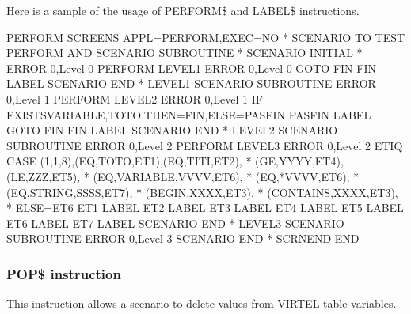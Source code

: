\documentclass[letterpaper,10pt,english]{sphinxmanual}
\begin{document}

Here is a sample of the usage of PERFORM\$ and LABEL\$ instructions.

\begin{sphinxVerbatim}[commandchars=\\\{\}]
PERFORM SCREENS APPL=PERFORM,EXEC=NO
* SCENARIO TO TEST PERFORM\PYGZdl{} AND SCENARIO SUBROUTINE
*
        SCENARIO INITIAL
*
        ERROR\PYGZdl{} 0,\PYGZsq{}Level 0\PYGZsq{}
        PERFORM\PYGZdl{} LEVEL1
        ERROR\PYGZdl{} 0,\PYGZsq{}Level 0\PYGZsq{}
        GOTO\PYGZdl{} FIN
        FIN LABEL\PYGZdl{}
        SCENARIO END
*
LEVEL1  SCENARIO SUBROUTINE
        ERROR\PYGZdl{} 0,\PYGZsq{}Level 1\PYGZsq{}
        PERFORM\PYGZdl{} LEVEL2
        ERROR\PYGZdl{} 0,\PYGZsq{}Level 1\PYGZsq{}
        IF\PYGZdl{} EXISTS\PYGZhy{}VARIABLE,\PYGZsq{}TOTO\PYGZsq{},THEN=FIN,ELSE=PASFIN
        PASFIN LABEL\PYGZdl{}
        GOTO\PYGZdl{} FIN
FIN     LABEL\PYGZdl{}
SCENARIO END
*
LEVEL2  SCENARIO SUBROUTINE
        ERROR\PYGZdl{} 0,\PYGZsq{}Level 2\PYGZsq{}
        PERFORM\PYGZdl{} LEVEL3
        ERROR\PYGZdl{} 0,\PYGZsq{}Level 2\PYGZsq{}
ETIQ    CASE\PYGZdl{} (1,1,8),(EQ,\PYGZsq{}TOTO\PYGZsq{},ET1),(EQ,\PYGZsq{}TITI\PYGZsq{},ET2),                  *
            (GE,\PYGZsq{}YYYY\PYGZsq{},ET4),(LE,\PYGZsq{}ZZZ\PYGZsq{},ET5),                             *
            (EQ,VARIABLE,\PYGZsq{}VVVV\PYGZsq{},ET6),                                   *
            (EQ,\PYGZsq{}*VVVV\PYGZsq{},ET6),                                           *
            (EQ,STRING,\PYGZsq{}SSSS\PYGZsq{},ET7),                                     *
            (BEGIN,\PYGZsq{}XXXX\PYGZsq{},ET3),                                         *
            (CONTAINS,\PYGZsq{}XXXX\PYGZsq{},ET3),                                      *
            ELSE=ET6
ET1     LABEL\PYGZdl{}
ET2     LABEL\PYGZdl{}
ET3     LABEL\PYGZdl{}
ET4     LABEL\PYGZdl{}
ET5     LABEL\PYGZdl{}
ET6     LABEL\PYGZdl{}
ET7     LABEL\PYGZdl{}
        SCENARIO END
*
LEVEL3  SCENARIO SUBROUTINE
        ERROR\PYGZdl{} 0,\PYGZsq{}Level 3\PYGZsq{}
        SCENARIO END
*
       SCRNEND
END
\end{sphinxVerbatim}


\subsubsection{POP\$ instruction}
\label{\detokenize{User_Guide:pop-instruction}}
This instruction allows a scenario to delete values from VIRTEL table variables.
\end{document}
